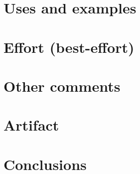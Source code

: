 \documentclass[preprint,numbers,10pt]{sigplanconf}
\begin{document}
\section{Uses and examples}

\section{Effort (best-effort)}

\section{Other comments}

\section{Artifact}

\section{Conclusions}



\end{document}
